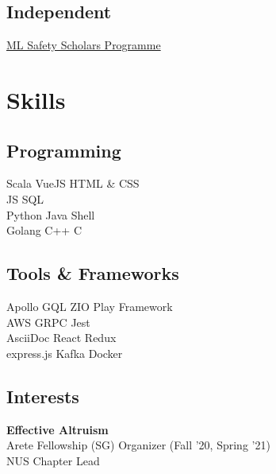 \documentclass[]{deedy-resume-openfont}
\begin{document}
\begin{minipage}[t]{0.33\textwidth}
\subsection{Independent}
\href{https://www.effectivealtruism.org/virtual-programs/ml-safety-scholars-program}{ML Safety Scholars Programme}\\
\sectionsep


\section{Skills}
\subsection{Programming}
Scala \textbullet{} VueJS \textbullet{} HTML \& CSS  \\ JS  \textbullet{} SQL \\
Python \textbullet{} Java\textbullet{} Shell \\ Golang \textbullet{} C++ \textbullet{} C \\
\sectionsep

\subsection{Tools \& Frameworks}
Apollo GQL \textbullet{} ZIO \textbullet{} Play Framework \\ AWS \textbullet{} GRPC \textbullet{} Jest \\ AsciiDoc \textbullet{} React \textbullet{} Redux \\ express.js \textbullet{} Kafka \textbullet{} Docker
\sectionsep

\subsection{Interests}
\textbf{Effective Altruism} \\
Arete Fellowship (SG) Organizer (Fall '20, Spring '21)\\
NUS Chapter Lead\\

%
%

\end{minipage} 
\hfill
\end{document}
